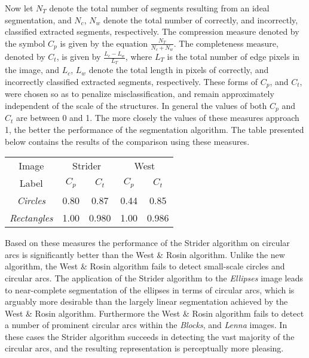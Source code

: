  Now let $N_T$ denote the total number of segments resulting from an ideal
segmentation, and $N_c$, $N_w$ denote the total number of correctly, and
incorrectly, classified extracted segments, respectively. The compression
measure denoted by the symbol {\bf $C_p$} is given by the equation
$\frac{N_T}{N_c + N_w}$. The completeness measure, denoted by {\bf $C_t$}, 
is given by $\frac{L_c - L_w}{L_T}$, where $L_T$ is the total number of edge
pixels in the image, and $L_c$, $L_w$ denote the total length in pixels of 
correctly, and incorrectly classified extracted segments, respectively. These
forms of {\bf $C_p$}, and {\bf $C_t$}, were chosen so as to penalize 
misclassification, and remain approximately independent of the scale of the 
structures. In general the values of both {\bf $C_p$} and {\bf $C_t$} are 
between 0 and 1. The more closely the values of these measures approach 1, 
the better the performance of the segmentation algorithm. The table
presented below contains the results of the comparison using these measures. 

\begin{table}[htbp]
\begin{center}
\begin{tabular}{|c|c|c|c|c|}
\hline
Image            & \multicolumn{2}{c|}{Strider} & \multicolumn{2}{c|}{West}\\
\cline{2-5}
Label            &{\bf $C_p$}   &{\bf $C_t$}   & {\bf $C_p$}   & {\bf $C_t$} \\
\hline
{\it Circles}    &     0.80     &     0.87     &     0.44      &   0.85   \\
\hline
{\it Rectangles} &     1.00     &     0.980    &     1.00      &   0.986   \\
\hline
\end{tabular}
\label{tbl:performance}
\end{center}
\end{table}

 Based on these measures the performance of the Strider algorithm on circular
arcs is significantly better than the West \& Rosin algorithm. Unlike the new 
algorithm, the West \& Rosin algorithm fails to detect small-scale circles 
and circular arcs. The 
application of the Strider algorithm to the {\it Ellipses} image leads to 
near-complete segmentation of the ellipses in terms of circular arcs, which 
is arguably more desirable than the largely linear segmentation achieved by 
the West \& Rosin algorithm. Furthermore the West \& Rosin algorithm fails to detect a number of 
prominent circular arcs within the  {\it Blocks}, and {\it Lenna} images. 
In these cases the Strider algorithm succeeds in detecting the vast majority 
of the circular arcs, and the resulting representation is perceptually more 
pleasing. 

